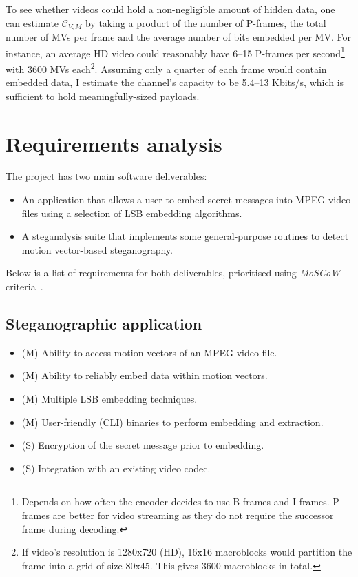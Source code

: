 \documentclass[12pt,british,twoside,notitlepage,usenames,dvipsnames,hypens,final]{report}
\numberwithin{equation}{section}
\numberwithin{figure}{section}
\begin{document}
To see whether videos could hold a non-negligible amount of hidden data, one can estimate $\mathcal{C}_{V, M}$ by taking a product of the number of P-frames, the total number of MVs per frame and the average number of bits embedded per MV. For instance, an average HD video could reasonably have 6--15 P-frames per second\footnote{Depends on how often the encoder decides to use B-frames and I-frames. P-frames are better for video streaming as they do not require the successor frame during decoding.} with 3600 MVs each\footnote{If video's resolution is 1280x720 (HD), 16x16 macroblocks would partition the frame into a grid of size 80x45. This gives 3600 macroblocks in total.}. Assuming only a quarter of each frame would contain embedded data, I estimate the channel's capacity to be 5.4--13 Kbits/s, which is sufficient to hold meaningfully-sized payloads. 

\section{Requirements analysis}

The project has two main software deliverables:
\begin{itemize}
\item  An application that allows a user to embed secret messages into MPEG video files using a selection of LSB embedding algorithms.
\item A steganalysis suite that implements some general-purpose routines to detect motion vector-based steganography.
\end{itemize}

Below is a list of requirements for both deliverables, prioritised using \emph{MoSCoW} criteria~\cite{softid-notes}.

\subsection{Steganographic application}
\label{req-steg-app}
\begin{itemize}
\item (M) Ability to access motion vectors of an MPEG video file.
\item (M) Ability to reliably embed data within motion vectors.
\item (M) Multiple LSB embedding techniques.
\item (M) User-friendly (CLI) binaries to perform embedding and extraction.
\item (S) Encryption of the secret message prior to embedding.
\item (S) Integration with an existing video codec.
\end{itemize}
\end{document}
